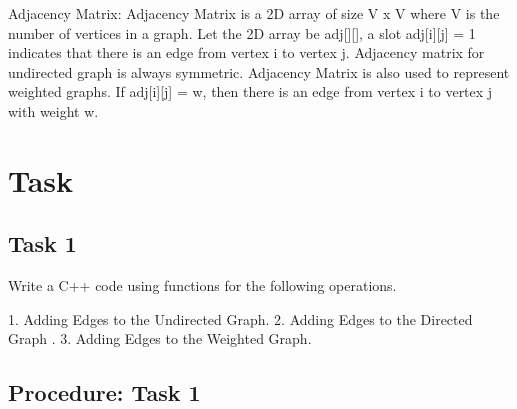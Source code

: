 \documentclass[11pt]{article}            %
\begin{document}
Adjacency Matrix:
Adjacency Matrix is a 2D array of size V x V where V is the number of vertices in a graph. Let the 2D array be adj[][], a slot adj[i][j] = 1 indicates that there is an edge from vertex i to vertex j. Adjacency matrix for undirected graph is always symmetric. Adjacency Matrix is also used to represent weighted graphs. If adj[i][j] = w, then there is an edge from vertex i to vertex j with weight w.

\section{Task}  

\subsection{ Task 1 }     


Write a C++ code using functions for the following operations. 
 
1. 
 Adding Edges to the Undirected Graph.
2.
 Adding Edges to the Directed Graph .
3.
 Adding Edges to the Weighted Graph.
 

\subsection{Procedure: Task 1 }    
 
\end{document}
